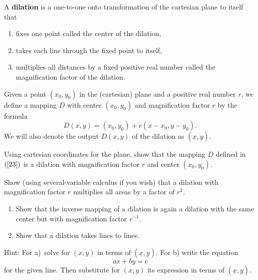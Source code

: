 \documentclass{ximera}
\begin{document}
\begin{definition}
A \textbf{dilation} is a one-to-one onto transformation of the
cartesian plane to itself that
\begin{enumerate}
\item fixes one point called the center of the dilation,
\item takes each line through the fixed point to itself,
\item multiplies all distances by a fixed positive real number called the
magnification factor of the dilation.
\end{enumerate}
\end{definition}

\begin{definition}
Given a point $\left(  x_{0},y_{0}\right)  $ in the (cartesian) plane and a
positive real number $r$, we define a mapping $D$ with center $\left(
x_{0},y_{0}\right)  $ and magnification factor $r$ by the formula%
\begin{equation}
D\left(  x,y\right)  =\left(  x_{0},y_{0}\right)  +r\left(  x-x_{0}%
,y-y_{0}\right)  . \label{23}%
\end{equation}
We will also denote the output $D\left(  x,y\right)  $ of the dilation as
$\left(  \underline{x},\underline{y}\right)  $.
\end{definition}

\begin{question}
Using cartesian coordinates for the plane, show that the mapping
$D$ defined in $\left(  \ref{23}\right)  $ is a dilation with magnification
factor $r$ and center $\left(  x_{0},y_{0}\right)  $.
\end{question}

\begin{question}
Show (using several-variable calculus if you wish) that a
dilation with magnification factor $r$ multiplies all areas by a factor of
$r^{2}$.
\end{question}

\begin{question}\hfil
\begin{enumerate}
\item Show that the inverse mapping of a dilation is again a
dilation with the same center but with magnification factor $r^{-1}$.
\item Show that a dilation takes lines to lines.
\end{enumerate}
Hint: For a)\ solve for $\left(  x,y\right)  $ in terms of $\left(
\underline{x},\underline{y}\right)  $. For b) write the equation%
\[
ax+by=c
\]
for the given line. Then substitute for $\left(  x,y\right)  $ its expression
in terms of $\left(  \underline{x},\underline{y}\right)$.
\end{question}
\end{document}
